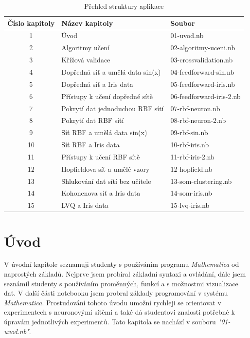\documentclass[11pt,twoside,a4paper]{book}
\begin{document}
\begin{center}
\begin{table}[h]
\begin{tabular}{|c|l|l|}
\hline 
Číslo kapitoly & Název kapitoly & Soubor \\ \hline
1 & Úvod & 01-uvod.nb \\ \hline
2 & Algoritmy učení & 02-algoritmy-uceni.nb \\ \hline
3 & Křížová validace & 03-crossvalidation.nb \\ \hline
4 & Dopředná síť a umělá data sin(x) & 04-feedforward-sin.nb \\ \hline
5 & Dopředná síť a Iris data & 05-feedforward-iris.nb \\ \hline
6 & Přístupy k učení dopředné sítě & 06-feedforward-iris-2.nb \\ \hline
7 & Pokrytí dat jednoduchou RBF sítí & 07-rbf-neuron.nb \\ \hline
8 & Pokrytí dat RBF sítí & 08-rbf-neuron-2.nb \\ \hline
9 & Síť RBF a umělá data sin(x) & 09-rbf-sin.nb \\ \hline
10 & Síť RBF a Iris data & 10-rbf-iris.nb \\ \hline
11 & Přístupy k učení RBF sítě & 11-rbf-iris-2.nb \\ \hline
12 & Hopfieldova síť a umělé vzory & 12-hopfield.nb \\ \hline
13 & Shlukování dat sítí bez učitele & 13-som-clustering.nb \\ \hline
14 & Kohonenova síť a Iris data & 14-som-iris.nb \\ \hline
15 & LVQ a Iris data & 15-lvq-iris.nb \\ \hline
\end{tabular}
\caption{Přehled struktury aplikace}
\label{tab:aplikace}
\end{table}
\end{center}

\section{Úvod}
V úvodní kapitole seznamuji studenty s používáním programu \textit{Mathematica} od naprostých základů. Nejprve jsem probíral základní syntaxi a ovládání, dále jsem seznámil studenty s používáním proměnných, funkcí a s možnostmi vizualizace dat. V další části notebooku jsem probral základy programování v systému \textit{Mathematica}. Prostudování tohoto úvodu umožní rychleji se orientovat v experimentech s neuronovými sítěmi a také dá studentovi znalosti potřebné k úpravám jednotlivých experimentů. Tato kapitola se nachází v souboru \textit{"01-uvod.nb"}.
\end{document}
